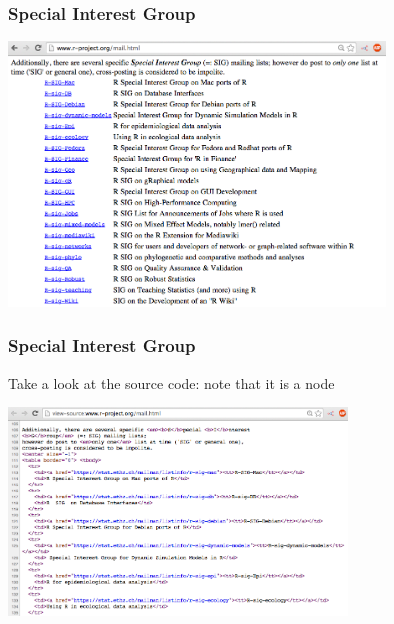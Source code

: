 \documentclass{beamer}\usepackage[]{graphicx}\usepackage[]{color}
\begin{document}

\begin{frame}
\frametitle{Special Interest Group}

\begin{center}
\includegraphics[width=10cm]{images/mailing_sig.png}
\end{center}

\end{frame}


\begin{frame}
\frametitle{Special Interest Group}

Take a look at the source code: note that it is a  node

\begin{center}
\includegraphics[width=9cm]{images/mailing_sig_source.png}
\end{center}

\end{frame}

\end{document}
